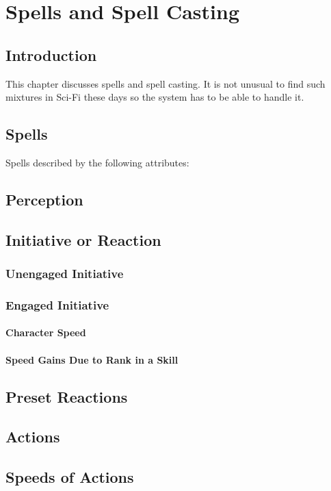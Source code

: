 \chapter{Spells and Spell Casting}

\section{Introduction}

This chapter discusses spells and spell casting. It is not unusual to
find such mixtures in Sci-Fi these days so the system has to be able to 
handle it. 

\section{Spells}

Spells described by the following attributes:

\section{Perception}
\section{Initiative or Reaction}
\subsection{Unengaged Initiative}
\subsection{Engaged Initiative}
\subsubsection{Character Speed}
\subsubsection{Speed Gains Due to Rank in a Skill}
\section{Preset Reactions}
\section{Actions}
\section{Speeds of Actions}
